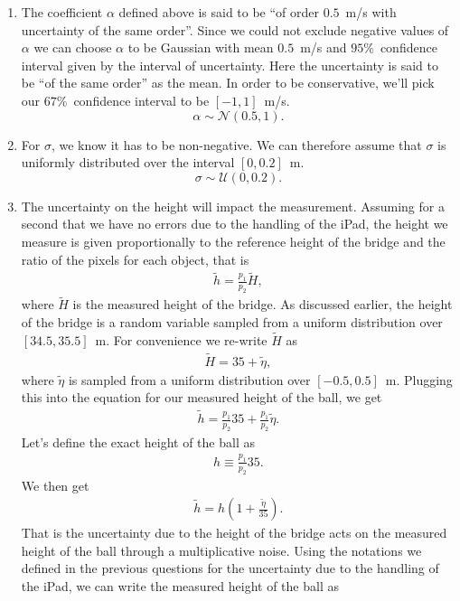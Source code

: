 \documentclass{article}
\begin{document}
\begin{enumerate}
 \item The coefficient $\alpha$ defined above is said to be ``of order $0.5$~m/s with uncertainty of the same order''. 
 Since we could not exclude negative values of $\alpha$ we can choose $\alpha$ to be Gaussian with mean $0.5$~m/s and $95\%$~confidence interval given by the interval of uncertainty. Here the uncertainty is said to be ``of the same order'' as the mean. In order to be conservative, we'll pick our $67\%$~confidence interval to be $[-1,1]$~m/s. 
\[ \alpha \sim \mathcal{N}(0.5, 1). \]
 \item For $\sigma$, we know it has to be non-negative. We can therefore assume that $\sigma$ is uniformly distributed over the interval $[0, 0.2]$~m.
\[ \sigma \sim \mathcal{U}(0, 0.2) . \]
 \item The uncertainty on the height will impact the measurement. Assuming for a second that we have no errors due to the handling of the iPad, the height we measure is given proportionally to the reference height of the bridge and the ratio of the pixels for each object, that is
 \begin{align*}
  \tilde{h} = \frac{p_1}{p_2} \tilde{H},
 \end{align*}
where $\tilde{H}$ is the measured height of the bridge. As discussed earlier, the height of the bridge is a random variable sampled from a uniform distribution over $[34.5, 35.5]$~m.
For convenience we re-write $\tilde{H}$ as
\begin{align*}
 \tilde{H} = 35 + \tilde{\eta},
\end{align*}
where $\tilde{\eta}$ is sampled from a uniform distribution over $[-0.5, 0.5]$~m. Plugging this into the equation for our measured height of the ball, we get
\begin{align*}
 \tilde{h} = \frac{p_1}{p_2} 35 + \frac{p_1}{p_2} \tilde{\eta}.
\end{align*}
Let's define the exact height of the ball as
\begin{align*}
 h \equiv \frac{p_1}{p_2} 35.
\end{align*}
We then get
\begin{align*}
 \tilde{h} = h \left( 1 + \frac{\tilde{\eta}}{35} \right).
\end{align*}
That is the uncertainty due to the height of the bridge acts on the measured height of the ball through a multiplicative noise. 
Using the notations we defined in the previous questions for the uncertainty due to the handling of the iPad, we can write the measured height of the ball as

\end{enumerate}
\end{document}
